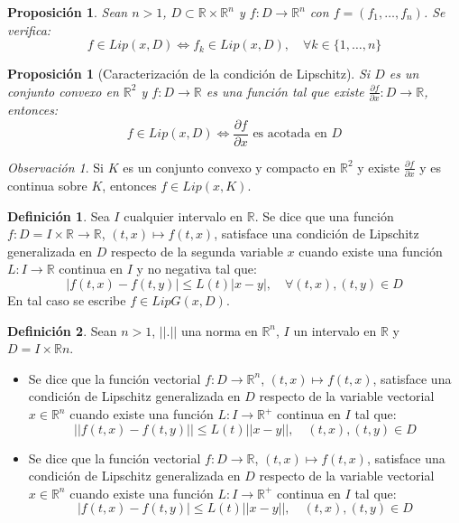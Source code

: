 \documentclass{report}
\newtheorem{proposition}[theorem]{Proposición}
\theoremstyle{remark}
\newtheorem*{remark}{Observación}
\theoremstyle{remark}
\theoremstyle{remark}
\theoremstyle{definition}
\newtheorem{definition}{Definición}[chapter]
\theoremstyle{definition}
\theoremstyle{definition}
\begin{document}
\begin{proposition}
    Sean $n > 1$, $D \subset \mathbb{R} \times \mathbb{R}^n$ y $f: D \to \mathbb{R}^n$ con $f = (f_1, \dots, f_n)$.
    Se verifica:
    $$f \in Lip(x, D) \Leftrightarrow f_k \in Lip(x, D), \quad \forall k \in \{1, \dots, n\}$$
\end{proposition}

\begin{proposition}[Caracterización de la condición de Lipschitz]
    Si $D$ es un conjunto convexo en $\mathbb{R}^2$ y $f: D \to \mathbb{R}$ es una función tal que existe $\frac{\partial f}{\partial x}: D \to \mathbb{R}$, entonces:
    $$f \in Lip(x, D) \Leftrightarrow \frac{\partial f}{\partial x} \text{ es acotada en } D$$
\end{proposition}

\begin{remark}
    Si $K$ es un conjunto convexo y compacto en $\mathbb{R}^2$ y existe $\frac{\partial f}{\partial x}$ y es continua sobre $K$, entonces $f \in Lip(x, K)$.
\end{remark}

\begin{definition}
    Sea $I$ cualquier intervalo en $\mathbb{R}$.
    Se dice que una función $f: D = I \times \mathbb{R} \to \mathbb{R}$, $(t, x) \mapsto f(t, x)$, satisface una condición de Lipschitz generalizada en $D$ respecto de la segunda variable $x$ cuando existe una función $L: I \to \mathbb{R}$ continua en $I$ y no negativa tal que:
    $$|f(t, x) - f(t, y)| \leq L(t) |x-y|, \quad \forall (t, x), (t, y) \in D$$
    En tal caso se escribe $f \in LipG(x, D)$.
\end{definition}

\begin{definition}
    Sean $n > 1$, $||.||$ una norma en $\mathbb{R}^n$, $I$ un intervalo en $\mathbb{R}$ y $D = I \times \mathbb{R}n$.
    \begin{itemize}
        \item Se dice que la función vectorial $f: D \to \mathbb{R}^n$, $(t, x) \mapsto f(t, x)$, satisface una condición de Lipschitz generalizada en $D$ respecto de la variable vectorial $x \in \mathbb{R}^n$ cuando existe una función $L: I \to \mathbb{R}^+$ continua en $I$ tal que:
              $$||f(t, x) - f(t, y)|| \leq L(t)||x-y||, \quad (t, x), (t, y) \in D$$
        \item Se dice que la función vectorial $f: D \to \mathbb{R}$, $(t, x) \mapsto f(t, x)$, satisface una condición de Lipschitz generalizada en $D$ respecto de la variable vectorial $x \in \mathbb{R}^n$ cuando existe una función $L: I \to \mathbb{R}^+$ continua en $I$ tal que:
              $$|f(t, x) - f(t, y)| \leq L(t)||x-y||, \quad (t, x), (t, y) \in D$$
    \end{itemize}
\end{definition}
\end{document}
